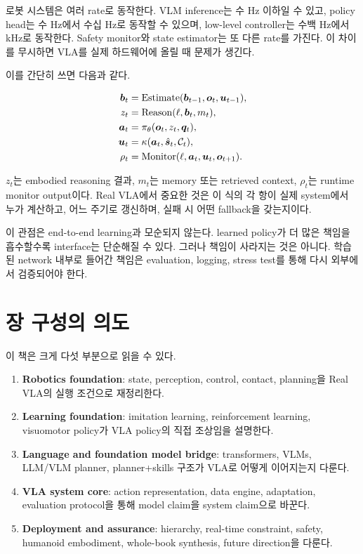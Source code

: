 로봇 시스템은 여러 rate로 동작한다. VLM inference는 수 Hz 이하일 수 있고, policy head는 수 Hz에서 수십 Hz로 동작할 수 있으며, low-level controller는 수백 Hz에서 kHz로 동작한다. Safety monitor와 state estimator는 또 다른 rate를 가진다. 이 차이를 무시하면 VLA를 실제 하드웨어에 올릴 때 문제가 생긴다.

이를 간단히 쓰면 다음과 같다.

\begin{align}
  \bm{b}_t &= \mathrm{Estimate}(\bm{b}_{t-1}, \bm{o}_t, \bm{u}_{t-1}), \\
  z_t &= \mathrm{Reason}(\ell, \bm{b}_t, m_t), \\
  \bm{a}_t &= \pi_\theta(\bm{o}_t, z_t, \bm{q}_t), \\
  \bm{u}_t &= \kappa(\bm{a}_t, \hat{\bm{s}}_t, \mathcal{C}_t), \\
  \rho_t &= \mathrm{Monitor}(\ell, \bm{a}_t, \bm{u}_t, \bm{o}_{t+1}).
  \label{eq:ch0-runtime-loop}
\end{align}

$z_t$는 embodied reasoning 결과, $m_t$는 memory 또는 retrieved context, $\rho_t$는 runtime monitor output이다. Real VLA에서 중요한 것은 이 식의 각 항이 실제 system에서 누가 계산하고, 어느 주기로 갱신하며, 실패 시 어떤 fallback을 갖는지이다.

이 관점은 end-to-end learning과 모순되지 않는다. learned policy가 더 많은 책임을 흡수할수록 interface는 단순해질 수 있다. 그러나 책임이 사라지는 것은 아니다. 학습된 network 내부로 들어간 책임은 evaluation, logging, stress test를 통해 다시 외부에서 검증되어야 한다.

\section{장 구성의 의도}

이 책은 크게 다섯 부분으로 읽을 수 있다.

\begin{enumerate}
  \item \textbf{Robotics foundation}: state, perception, control, contact, planning을 Real VLA의 실행 조건으로 재정리한다.
  \item \textbf{Learning foundation}: imitation learning, reinforcement learning, visuomotor policy가 VLA policy의 직접 조상임을 설명한다.
  \item \textbf{Language and foundation model bridge}: transformers, VLMs, LLM/VLM planner, planner+skills 구조가 VLA로 어떻게 이어지는지 다룬다.
  \item \textbf{VLA system core}: action representation, data engine, adaptation, evaluation protocol을 통해 model claim을 system claim으로 바꾼다.
  \item \textbf{Deployment and assurance}: hierarchy, real-time constraint, safety, humanoid embodiment, whole-book synthesis, future direction을 다룬다.
\end{enumerate}

